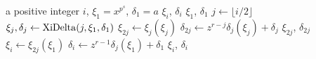 \documentclass[12pt]{article}
\theoremstyle{plain}
\theoremstyle{definition}
\newcounter{algorithm}
\begin{document}
\begin{algorithm}
	\label{algorithm:xidelta}
	\begin{algorithmic}[1]
		\REQUIRE a positive integer $i$, $\xi_1 = x^{p^s}$, $\delta_1 = a$
		\ENSURE $\xi_i$, $\delta_i$
		\RETURN $\xi_1$, $\delta_1$
		\ENDIF
		\STATE $j \leftarrow \lfloor i/2\rfloor$
		\STATE $\xi_{j}, \delta_j \leftarrow {\rm XiDelta}(j,\xi_1,\delta_1)$ 
		\STATE\label{step:xi} $\xi_{2j} \leftarrow \xi_j(\xi_j)$
		\STATE\label{step:delta} $\delta_{2j} \leftarrow z^{r - j}\delta_j(\xi_j) + \delta_j$
		\RETURN $\xi_{2j}$, $\delta_{2j}$
		\ENDIF
		\STATE $\xi_i \leftarrow \xi_{2j}(\xi_1)$
		\STATE $\delta_i \leftarrow z^{r - 1}\delta_j(\xi_1) + \delta_1$
		\RETURN $\xi_i$, $\delta_i$
	\end{algorithmic}
\end{algorithm}
\end{document}
